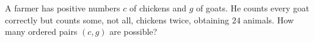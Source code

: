 A farmer has positive numbers $c$ of chickens and $g$ of goats. He counts every goat correctly but counts some, not all, chickens twice, obtaining $24$ animals. How many ordered pairs $(c,g)$ are possible?
